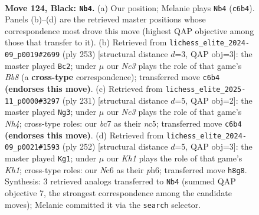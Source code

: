 \documentclass[11pt]{article}
\begin{document}
\clearpage

\begin{figure}[p]\centering
\begin{subfigure}{0.46\textwidth}\centering
\resizebox{\linewidth}{!}{%
\newchessgame
\chessboard[
  setfen={7k/2B5/2n3K1/5P2/8/8/4b3/8 b - - 6 124},
  showmover=false,
  pgfstyle=straightmove, color=movearrow, markmove={c6-b4}
]}
\caption{}
\end{subfigure}\hfill
\begin{subfigure}{0.46\textwidth}\centering
\resizebox{\linewidth}{!}{%
\newchessgame
\chessboard[
  setfen={8/8/8/1K6/P2k4/5B2/8/1b6 b - - 0 127},
  showmover=false,
  pgfstyle=straightmove, color=movearrow, markmove={b1-c2}
]}
\caption{}
\end{subfigure}
\\[4pt]
\begin{subfigure}{0.46\textwidth}\centering
\resizebox{\linewidth}{!}{%
\newchessgame
\chessboard[
  setfen={8/5K2/6P1/2N1k2n/8/8/8/8 b - - 98 116},
  showmover=false,
  pgfstyle=straightmove, color=movearrow, markmove={h5-g3}
]}
\caption{}
\end{subfigure}\hfill
\begin{subfigure}{0.46\textwidth}\centering
\resizebox{\linewidth}{!}{%
\newchessgame
\chessboard[
  setfen={8/8/7p/b7/7p/6k1/8/7K w - - 2 127},
  showmover=false,
  pgfstyle=straightmove, color=movearrow, markmove={h1-g1}
]}
\caption{}
\end{subfigure}
\caption{\textbf{Move 124, Black: \texttt{Nb4}.} (a) Our position; Melanie plays \texttt{Nb4} (\texttt{c6b4}). Panels (b)--(d) are the retrieved master positions whose correspondence most drove this move (highest QAP objective among those that transfer to it). (b) Retrieved from \texttt{lichess\_elite\_2024-09\_p0019\#2699} (ply 253) [structural distance $d$=3, QAP obj=3]: the master played \texttt{Bc2}; under $\mu$ our \emph{Nc3} plays the role of that game's \emph{Bb8} (a \textbf{cross-type} correspondence); transferred move \texttt{c6b4} \textbf{(endorses this move)}. (c) Retrieved from \texttt{lichess\_elite\_2025-11\_p0000\#3297} (ply 231) [structural distance $d$=5, QAP obj=2]: the master played \texttt{Ng3}; under $\mu$ our \emph{Nc3} plays the role of that game's \emph{Nh4}; cross-type roles: our \emph{b}c7 as their \emph{n}c5; transferred move \texttt{c6b4} \textbf{(endorses this move)}. (d) Retrieved from \texttt{lichess\_elite\_2024-09\_p0021\#1593} (ply 252) [structural distance $d$=5, QAP obj=3]: the master played \texttt{Kg1}; under $\mu$ our \emph{Kh1} plays the role of that game's \emph{Kh1}; cross-type roles: our \emph{N}c6 as their \emph{p}h6; transferred move \texttt{h8g8}. Synthesis: 3 retrieved analogs transferred to \texttt{Nb4} (summed QAP objective 7, the strongest correspondence among the candidate moves); Melanie committed it via the \texttt{search} selector.}
\label{fig:thought-m247}
\end{figure}
\end{document}
